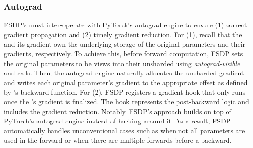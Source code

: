 \subsubsection{Autograd}
\label{subsubsection:autograd}\hfill \break

FSDP's  must inter-operate with PyTorch's autograd engine to ensure (1) correct gradient propagation and (2) timely gradient reduction. For (1), recall that the  and its gradient own the underlying storage of the original parameters and their gradients, respectively. To achieve this, before forward computation, FSDP sets the original parameters to be views into their unsharded  using \textit{autograd-visible}  and  calls. Then, the autograd engine naturally allocates the unsharded  gradient and writes each original parameter's gradient to the appropriate offset as defined by 's backward function. For (2), FSDP registers a gradient hook that only runs once the 's gradient is finalized. The hook represents the post-backward logic and includes the gradient reduction. Notably, FSDP's approach builds on top of PyTorch's autograd engine instead of hacking around it. As a result, FSDP automatically handles unconventional cases such as when not all parameters are used in the forward or when there are multiple forwards before a backward.





